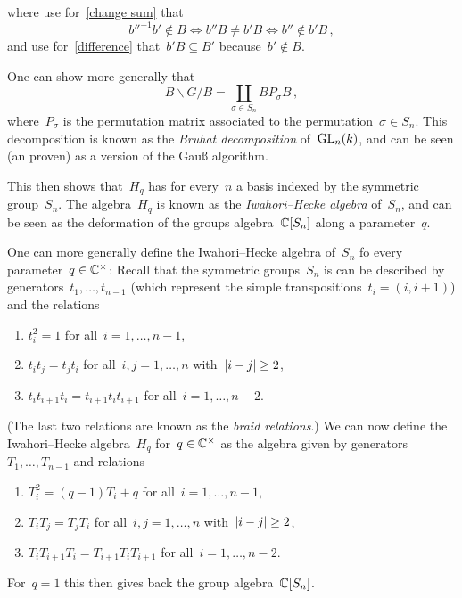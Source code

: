 \endgroup
where use for~\eqref{change sum} that
\[
        b''^{-1} b' \notin  B
  \iff  b'' B \neq b' B
  \iff  b'' \notin b' B \,,
\]
and use for~\eqref{difference} that~$b' B \subseteq B'$ because~$b' \notin B$.


\begin{remark}
  One can show more generally that
  \[
      B \backslash G / B
    = \coprod_{\sigma \in S_n} B P_\sigma B \,,
  \]
  where~$P_\sigma$ is the permutation matrix associated to the permutation~$\sigma \in S_n$.
  This decomposition is known as the \emph{Bruhat decomposition} of~$\operatorname{GL}_n(k)$, and can be seen (an proven) as a version of the Gauß algorithm.
  
  This then shows that~$H_q$ has for every~$n$ a basis indexed by the symmetric group~$S_n$.
  The algebra~$H_q$ is known as the \emph{Iwahori--Hecke algebra} of~$S_n$, and can be seen as the deformation of the groups algebra~$\mathbb{C}[S_n]$ along a parameter~$q$.
  
  One can more generally define the Iwahori--Hecke algebra of~$S_n$ fo every parameter~$q \in \mathbb{C}^\times$:
  Recall that the symmetric groups~$S_n$ is can be described by generators~$t_1, \dotsc, t_{n-1}$ (which represent the simple transpositions~$t_i = (i,i+1)$) and the relations
  \begin{enumerate}[label=(R\arabic*)]
    \item
      $t_i^2 = 1$ for all~$i = 1, \dotsc, n-1$,
    \item
      $t_i t_j = t_j t_i$ for all~$i, j = 1, \dotsc, n$ with~$\lvert i-j\rvert \geq 2$,
    \item
      $t_i t_{i+1} t_i = t_{i+1} t_i t_{i+1}$ for all~$i = 1, \dotsc, n-2$.
  \end{enumerate}
  (The last two relations are known as the \emph{braid relations}.)
  We can now define the Iwahori--Hecke algebra~$H_q$ for~$q \in \mathbb{C}^\times$ as the algebra given by generators~$T_1, \dotsc, T_{n-1}$ and relations
  \begin{enumerate}[label=(IH\arabic*)]
    \item
      $T_i^2 = (q-1) T_i + q$ for all~$i = 1, \dotsc, n-1$,
    \item
      $T_i T_j = T_j T_i$ for all~$i, j = 1, \dotsc, n$ with~$\lvert i-j\rvert \geq 2$,
    \item
      $T_i T_{i+1} T_i = T_{i+1} T_i T_{i+1}$ for all~$i = 1, \dotsc, n-2$.
  \end{enumerate}
  For~$q = 1$ this then gives back the group algebra~$\mathbb{C}[S_n]$.
\end{remark}

































